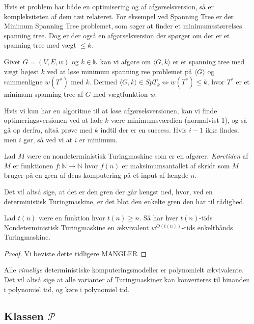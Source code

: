 Hvis et problem har både en optimisering og af afgørselsversion, så er kompleksiteten af dem tæt relateret. For eksempel ved Spanning Tree er der Minimum Spanning Tree problemet, som søger at finder et minimumsstørrelses spanning tree. Dog er der også en afgørselsversion der spørger om der er et spanning tree med vægt $\le k$.

Givet $G = ( V,E,w )$ og $k \in \mathbb{N}$  kan vi afgøre om $\langle G , k \rangle $ er et spanning tree med vægt højest $k$ ved at løse minimum spanning ree problemet på $\langle G \rangle $ og sammenligne $w(T^{*})$ med $k$. Dermed $\langle G, k \rangle \in SpT_{k} \iff w(T^{*}) \le k$, hvor $T^{*}$ er et minimum spanning tree af $G$ med vægtfunktion $w$.

Hvis vi kun har en algoritme til at løse afgørselsversionen, kan vi finde optimeringsversionen ved at lade $k$ være minimumsværdien (normalvist 1), og så gå op derfra, altså prøve med $k$ indtil der er en success. Hvis $i-1$ ikke findes, men $i$ gør, så ved vi at $i$ er minimum.

\begin{definition}
	Lad $M$ være en nondeterministisk Turingmaskine som er en afgører. \textit{Køretiden} af $M$ er funktionen $f : \mathbb{N} \rightarrow \mathbb{N}$ hvor $f(n)$ er maksimumsantallet af skridt som $M$ bruger på en gren af dens komputering på et input af længde $n$.
\end{definition}

Det vil altså sige, at det er den gren der går længst ned, hvor, ved en deterministisk Turingmaskine, er det blot den enkelte gren den har til rådighed.

\begin{theorem}
	Lad $t(n)$ være en funktion hvor $t(n) \ge n$. Så har hver $t(n)$-tids Nondeterministisk Turingmaskine en ækvivalent $w^{O(t(n))}$-tids enkeltbånds Turingmaskine.
\end{theorem}

\begin{proof}
	Vi beviste dette tidligere MANGLER
\end{proof}

Alle \textit{rimelige} deterministiske komputeringsmodeller er polynomielt ækvivalente. Det vil altså sige at alle varianter af Turingmaskiner kan konverteres til hinanden i polynomiel tid, og køre i polynomiel tid.

\subsection{Klassen $\mathcal{P}$}%
\label{subsec:label}

